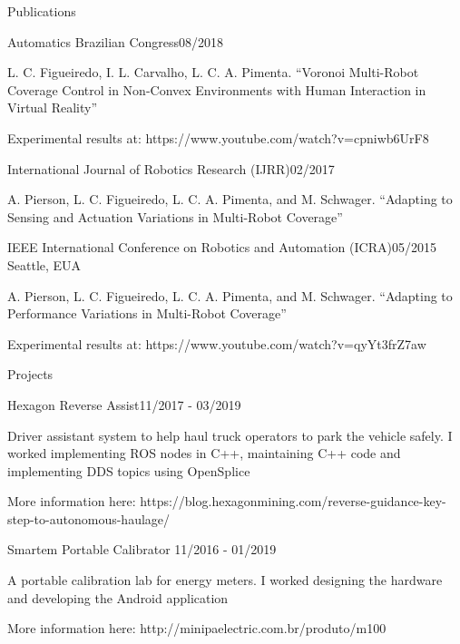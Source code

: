 \documentclass[14pt, a4paper]{resume} %
\begin{document}
\begin{rSection}{Publications}
	
\begin{rSubsection}{Automatics Brazilian Congress}{08/2018}{}{}
	
\item L. C. Figueiredo, I. L. Carvalho, L. C. A. Pimenta. ``Voronoi Multi-Robot Coverage Control in Non-Convex Environments with Human Interaction in Virtual Reality''
\item Experimental results at: https://www.youtube.com/watch?v=cpniwb6UrF8

\end{rSubsection}	
	
\begin{rSubsection}{International Journal of Robotics Research (IJRR)}{02/2017}{}{}
	
\item A. Pierson, L. C. Figueiredo, L. C. A. Pimenta, and M. Schwager. ``Adapting to Sensing and Actuation Variations in Multi-Robot Coverage''

\end{rSubsection}

\begin{rSubsection}{IEEE International Conference on Robotics and Automation (ICRA)}{05/2015}{}{ \normalfont Seattle, EUA}

\item A. Pierson, L. C. Figueiredo, L. C. A. Pimenta, and M. Schwager. ``Adapting to Performance Variations in Multi-Robot Coverage''
\item Experimental results at: https://www.youtube.com/watch?v=qyYt3frZ7aw


\end{rSubsection}


\end{rSection}

\begin{rSection}{Projects}
	\begin{rSubsection}{Hexagon Reverse Assist}{11/2017 - 03/2019}{}{}
		\item Driver assistant system to help haul truck operators to park the vehicle safely. I worked implementing ROS nodes in C++, maintaining C++ code and implementing DDS topics using OpenSplice
		\item More information here: https://blog.hexagonmining.com/reverse-guidance-key-step-to-autonomous-haulage/
	\end{rSubsection}
	
	
	\begin{rSubsection}{Smartem Portable Calibrator	}{11/2016 - 01/2019}{}{}
		\item A portable calibration lab for energy meters. I worked designing the hardware and developing the Android application
		\item More information here: http://minipaelectric.com.br/produto/m100
	\end{rSubsection}
\end{rSection}
\end{document}
